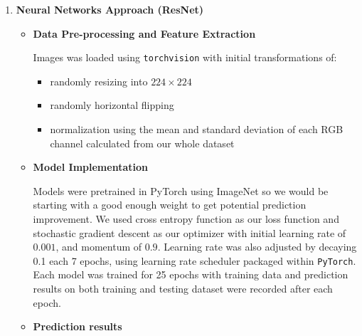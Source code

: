 \documentclass[11.5pt]{article}
\begin{document}
\begin{enumerate}
\begin{itemize}
            
        \end{itemize}
        \item \textbf{Neural Networks Approach (ResNet)}
        \begin{itemize}
            \item \textbf{Data Pre-processing and Feature Extraction}

            Images was loaded using \texttt{torchvision} with initial transformations of:
            \begin{itemize}
                \item randomly resizing into $224 \times 224$
                \item randomly horizontal flipping
                \item normalization using the mean and standard deviation of each RGB channel calculated from our whole dataset
            \end{itemize}

            \item \textbf{Model Implementation}

            Models were pretrained in PyTorch using ImageNet so we would be starting with a good enough weight to get potential prediction improvement.
            We used cross entropy function as our loss function and stochastic gradient descent as our optimizer with initial learning rate of $0.001$, and momentum of $0.9$.
            Learning rate was also adjusted by decaying 0.1 each 7 epochs, using learning rate scheduler packaged within \texttt{PyTorch}.
            Each model was trained for 25 epochs with training data and prediction results on both training and testing dataset were recorded after each epoch.
            \item \textbf{Prediction results}
            

\end{itemize}
\end{enumerate}
\end{document}

